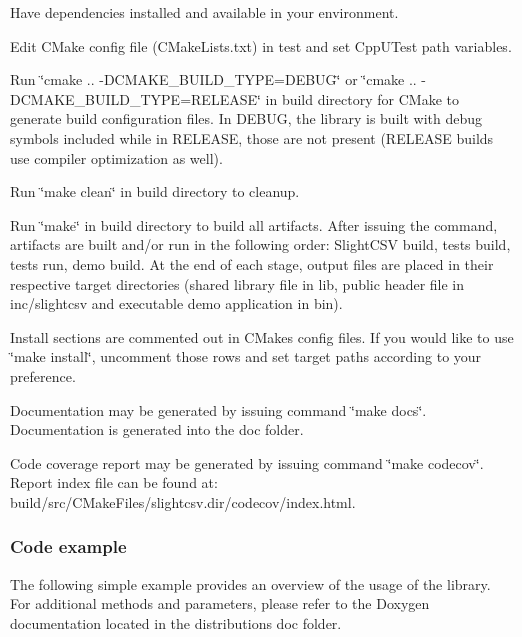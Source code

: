 \begin{DoxyItemize}
\item Have dependencies installed and available in your environment.
\item Edit C\+Make config file (C\+Make\+Lists.\+txt) in test and set Cpp\+U\+Test path variables.
\item Run \char`\"{}cmake .. -\/\+D\+C\+M\+A\+K\+E\+\_\+\+B\+U\+I\+L\+D\+\_\+\+T\+Y\+P\+E=\+D\+E\+B\+U\+G\char`\"{} or \char`\"{}cmake .. -\/\+D\+C\+M\+A\+K\+E\+\_\+\+B\+U\+I\+L\+D\+\_\+\+T\+Y\+P\+E=\+R\+E\+L\+E\+A\+S\+E\char`\"{} in build directory for C\+Make to generate build configuration files. In D\+E\+B\+UG, the library is built with debug symbols included while in R\+E\+L\+E\+A\+SE, those are not present (R\+E\+L\+E\+A\+SE builds use compiler optimization as well).
\item Run \char`\"{}make clean\char`\"{} in build directory to cleanup.
\item Run \char`\"{}make\char`\"{} in build directory to build all artifacts. After issuing the command, artifacts are built and/or run in the following order\+: Slight\+C\+SV build, tests build, tests run, demo build. At the end of each stage, output files are placed in their respective target directories (shared library file in lib, public header file in inc/slightcsv and executable demo application in bin).
\item Install sections are commented out in C\+Make\textquotesingle{}s config files. If you would like to use \char`\"{}make install\char`\"{}, uncomment those rows and set target paths according to your preference.
\item Documentation may be generated by issuing command \char`\"{}make docs\char`\"{}. Documentation is generated into the doc folder.
\item Code coverage report may be generated by issuing command \char`\"{}make codecov\char`\"{}. Report index file can be found at\+: build/src/\+C\+Make\+Files/slightcsv.\+dir/codecov/index.html.
\end{DoxyItemize}

\subsubsection*{Code example}

The following simple example provides an overview of the usage of the library. For additional methods and parameters, please refer to the Doxygen documentation located in the distribution\textquotesingle{}s doc folder.


